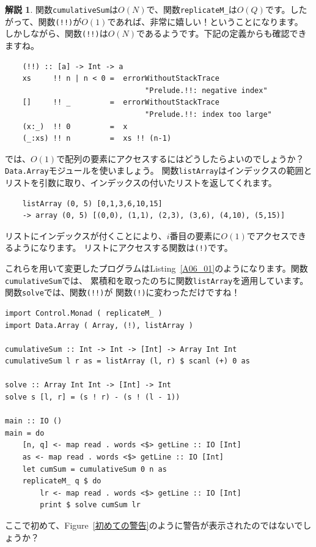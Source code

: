 \documentclass[12pt,a4paper,dvipdfmx,fleqn]{article}%
\theoremstyle{definition}
\theoremstyle{definition}
\newtheorem*{ans*}{解説}
\theoremstyle{definition}
\begin{document}
\begin{ans*}
    関数\texttt{cumulativeSum}は$O(N)$で、関数\texttt{replicateM\_}は$O(Q)$です。したがって、関数\texttt{(!!)}が$O(1)$であれば、非常に嬉しい！ということになります。
    しかしながら、関数\texttt{(!!)}は$O(N)$であるようです。下記の定義からも確認できますね。
    \begin{verbatim}
    (!!) :: [a] -> Int -> a
    xs     !! n | n < 0 =  errorWithoutStackTrace 
                                "Prelude.!!: negative index"
    []     !! _         =  errorWithoutStackTrace 
                                "Prelude.!!: index too large"
    (x:_)  !! 0         =  x
    (_:xs) !! n         =  xs !! (n-1)
    \end{verbatim}
    \vspace*{-4mm}
    では、$O(1)$で配列の要素にアクセスするにはどうしたらよいのでしょうか？ \texttt{Data.Array}モジュールを使いましょう。
    関数\texttt{listArray}はインデックスの範囲とリストを引数に取り、インデックスの付いたリストを返してくれます。
    \begin{verbatim}
    listArray (0, 5) [0,1,3,6,10,15]
    -> array (0, 5) [(0,0), (1,1), (2,3), (3,6), (4,10), (5,15)]
    \end{verbatim}
    \vspace*{-4mm}
    リストにインデックスが付くことにより、$i$番目の要素に$O(1)$でアクセスできるようになります。
    リストにアクセスする関数は\texttt{(!)}です。\par
    これらを用いて変更したプログラムはListing~\ref{A06_01}のようになります。関数\texttt{cumulativeSum}では、
    累積和を取ったのちに関数\texttt{listArray}を適用しています。関数\texttt{solve}では、関数\texttt{(!!)}が
    関数\texttt{(!)}に変わっただけですね！
\end{ans*}
\begin{lstlisting}[caption=A06\_01.hs,label=A06_01]
import Control.Monad ( replicateM_ )
import Data.Array ( Array, (!), listArray )

cumulativeSum :: Int -> Int -> [Int] -> Array Int Int
cumulativeSum l r as = listArray (l, r) $ scanl (+) 0 as

solve :: Array Int Int -> [Int] -> Int
solve s [l, r] = (s ! r) - (s ! (l - 1))

main :: IO ()
main = do
    [n, q] <- map read . words <$> getLine :: IO [Int]
    as <- map read . words <$> getLine :: IO [Int]
    let cumSum = cumulativeSum 0 n as
    replicateM_ q $ do
        lr <- map read . words <$> getLine :: IO [Int]
        print $ solve cumSum lr
\end{lstlisting}
\chub ここで初めて、Figure~\ref{初めての警告}のように警告が表示されたのではないでしょうか？
\end{document}
